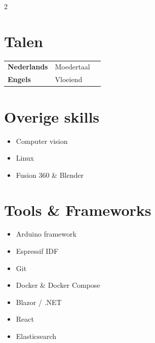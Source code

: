 \documentclass[lighthipster]{simplehipstercv}
\begin{document}
\begin{paracol}{2}
        \bigskip
        \bigskip

        \begin{minipage}[t]{0.3\textwidth}
            \vspace{0pt}
            \section*{Talen}

            \begin{tabular}{l | ll}
                \textbf{Nederlands} & {\footnotesize Moedertaal} \\
                \textbf{Engels}     & {\footnotesize Vloeiend} \\
            \end{tabular}
            \bigskip

            \section*{Overige skills}
            \begin{itemize}
                \item Computer vision
                \item Linux
                \item Fusion 360 \& Blender
            \end{itemize}
        \end{minipage}
        \hfill
        \begin{minipage}[t]{0.3\textwidth}
            \vspace{0pt}
            \section*{Tools \& Frameworks}
            \begin{itemize}
                \item Arduino framework
                \item Espressif IDF
                \item Git
                \item Docker \& Docker Compose
                \item Blazor / .NET
                \item React
                \item Elasticsearch
            \end{itemize}
        \end{minipage}


\end{paracol}
\end{document}
